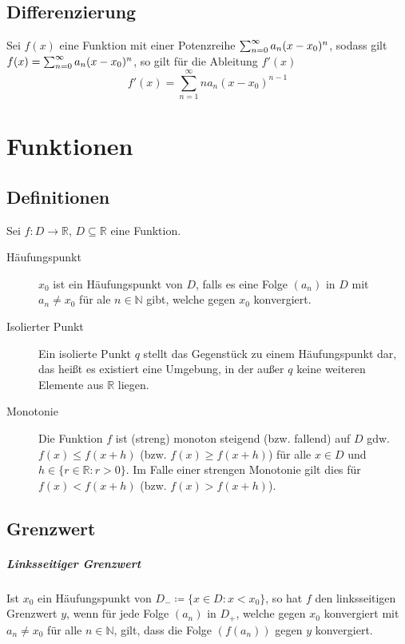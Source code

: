 	\section{Differenzierung}
		Sei $ f(x) $ eine Funktion mit einer Potenzreihe $ \sum_{n = 0}^\infty a _ n (x - x _ 0) ^ n $, sodass gilt $ f(x) = \sum_{n = 0}^\infty a _ n (x - x _ 0) ^ n $, so gilt für die Ableitung $ f'(x) $ \[ f'(x) = \sum _ { n = 1 } ^ \infty n a _ n (x - x _ 0) ^ { n - 1 } \]

\chapter{Funktionen}
	\section{Definitionen}
		Sei $ f : D \rightarrow \mathbb{R} $, $ D \subseteq \mathbb{R} $ eine Funktion.

		\begin{description}
			\item[Häufungspunkt] $ x _ 0 $ ist ein Häufungspunkt von $ D $, falls es eine Folge $ (a _ n) $ in $ D $ mit $ a _ n \neq x _ 0 $ für ale $ n \in \mathbb{N} $ gibt, welche gegen $ x _ 0 $ konvergiert.
			\item[Isolierter Punkt] Ein isolierte Punkt $ q $ stellt das Gegenstück zu einem Häufungspunkt dar, das heißt es existiert eine Umgebung, in der außer $ q $ keine weiteren Elemente aus $ \mathbb{R} $ liegen.
			\item[Monotonie] Die Funktion $ f $ ist (streng) monoton steigend (bzw. fallend) auf $ D $ gdw. $ f(x) \leq f(x + h) $ (bzw. $ f(x) \geq f(x + h) $) für alle $ x \in D $ und $ h \in \{ r \in \mathbb{R} : r > 0 \} $. Im Falle einer strengen Monotonie gilt dies für $ f(x) < f(x + h) $ (bzw. $ f(x) > f(x + h) $).
		\end{description}

	\section{Grenzwert}
		\paragraph{Linksseitiger Grenzwert}
			Ist $ x _ 0 $ ein Häufungspunkt von $ D _ - \coloneqq \{ x \in D : x < x _ 0 \} $, so hat $ f $ den linksseitigen Grenzwert $ y $, wenn für jede Folge $ (a _ n) $ in $ D _ + $, welche gegen $ x _ 0 $ konvergiert mit $ a _ n \neq x _ 0 $ für alle $ n \in \mathbb{N} $, gilt, dass die Folge $ (f(a _ n)) $ gegen $ y $ konvergiert.


